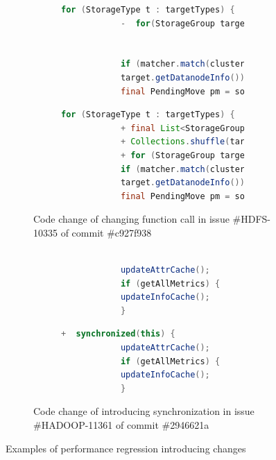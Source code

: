 \begin{figure}
	\centering
	\begin{subfigure}{\textwidth}%
		\begin{subfigure}{0.51\textwidth}
			\begin{lstlisting}[language=Java]
			for (StorageType t : targetTypes) {																		
			-  for(StorageGroup target:storages.getTargetStorages(t)) {
			
			
			if (matcher.match(cluster, source.getDatanodeInfo(),
			target.getDatanodeInfo())) {
			final PendingMove pm = source.addPendingMove(db, target);
			\end{lstlisting}
		\end{subfigure}
		\begin{subfigure}{0.51\textwidth}
			\begin{lstlisting}[language=Java]
			for (StorageType t : targetTypes) {																		
			+ final List<StorageGroup> targets=storages.getTargetStorages(t);
			+ Collections.shuffle(targets); 
			+ for (StorageGroup target : targets) {
			if (matcher.match(cluster, source.getDatanodeInfo(),
			target.getDatanodeInfo())) {
			final PendingMove pm = source.addPendingMove(db, target);
			\end{lstlisting}
		\end{subfigure}
		\caption{Code change of changing function call in issue \#HDFS-10335 of commit \#c927f938}\label{fig:1a}
	\end{subfigure}
	\vspace*{\fill} %
	\begin{subfigure}{\textwidth}%
		\begin{subfigure}{0.51\textwidth}
			\begin{lstlisting}[language=java]
			
			updateAttrCache();
			if (getAllMetrics) {		       
			updateInfoCache();		       
			}
			\end{lstlisting}
		\end{subfigure}
		\begin{subfigure}{0.51\textwidth}
			\begin{lstlisting}[language=Java]
			+  synchronized(this) {
			updateAttrCache();
			if (getAllMetrics) {		       
			updateInfoCache();		       
			}
			\end{lstlisting}
		\end{subfigure}
		\caption{Code change of introducing synchronization in issue \#HADOOP-11361 of commit \#2946621a}\label{fig:1b}
	\end{subfigure}
	\caption{Examples of performance regression introducing changes} \label{fig:example}
\end{figure}

